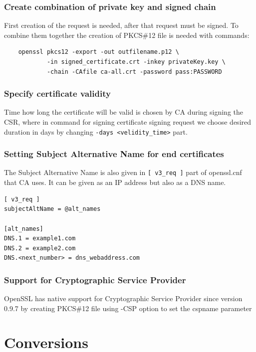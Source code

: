 \documentclass[10pt, a4paper]{report}
\begin{document}
    \subsubsection{Create combination of private key and signed chain}
    First creation of the request is needed, after that request must be signed. To combine them together the creation of PKCS\#12 file is needed with commands:
\begin{verbatim}
	openssl pkcs12 -export -out outfilename.p12 \
	        -in signed_certificate.crt -inkey privateKey.key \
	        -chain -CAfile ca-all.crt -password pass:PASSWORD
\end{verbatim}
    \subsubsection{Specify certificate validity}
    Time how long the certificate will be valid is chosen by CA during signing the CSR, where in command for signing certificate signing request we choose desired duration in days by changing \verb+-days <velidity_time>+ part.

    \subsubsection{Setting Subject Alternative Name for end certificates}
    The Subject Alternative Name is also given in \verb+[ v3_req ]+ part of openssl.cnf that CA uses. It can be given as an IP address but also as a DNS name.

\begin{verbatim}
[ v3_req ]
subjectAltName = @alt_names

[alt_names]
DNS.1 = example1.com
DNS.2 = example2.com
DNS.<next_number> = dns_webaddress.com
\end{verbatim}

    \subsubsection{Support for Cryptographic Service Provider}
OpenSSL has native support for Cryptographic Service Provider since version 0.9.7 by creating PKCS\#12 file using -CSP option to set the cspname parameter

    
\section{Conversions}
\end{document}
